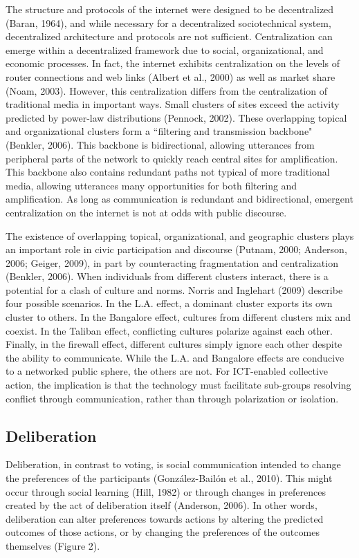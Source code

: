The structure and protocols of the internet were designed to be decentralized (Baran, 1964), and while necessary for a decentralized sociotechnical system, decentralized architecture and protocols are not sufficient. Centralization can emerge within a decentralized framework due to social, organizational, and economic processes. In fact, the internet exhibits centralization on the levels of router connections and web links (Albert et al., 2000) as well as market share (Noam, 2003). However, this centralization differs from the centralization of traditional media in important ways. Small clusters of sites exceed the activity predicted by power-law distributions (Pennock, 2002). These overlapping topical and organizational clusters form a “filtering and transmission backbone" (Benkler, 2006). This backbone is bidirectional, allowing utterances from peripheral parts of the network to quickly reach central sites for amplification. This backbone also contains redundant paths not typical of more traditional media, allowing utterances many opportunities for both filtering and amplification. As long as communication is redundant and bidirectional, emergent centralization on the internet is not at odds with public discourse.

The existence of overlapping topical, organizational, and geographic clusters plays an important role in civic participation and discourse (Putnam, 2000; Anderson, 2006; Geiger, 2009), in part by counteracting fragmentation and centralization (Benkler, 2006). When individuals from different clusters interact, there is a potential for a clash of culture and norms. Norris and Inglehart (2009) describe four possible scenarios. In the L.A. effect, a dominant cluster exports its own cluster to others. In the Bangalore effect, cultures from different clusters mix and coexist. In the Taliban effect, conflicting cultures polarize against each other. Finally, in the firewall effect, different cultures simply ignore each other despite the ability to communicate. While the L.A. and Bangalore effects are conducive to a networked public sphere, the others are not. For ICT-enabled collective action, the implication is that the technology must facilitate sub-groups resolving conflict through communication, rather than through polarization or isolation.

\subsection{Deliberation}
Deliberation, in contrast to voting, is social communication intended to change the preferences of the participants (Gonz\'alez-Bail\'on et al., 2010). This might occur through social learning (Hill, 1982) or through changes in preferences created by the act of deliberation itself (Anderson, 2006). In other words, deliberation can alter preferences towards actions by altering the predicted outcomes of those actions, or by changing the preferences of the outcomes themselves (Figure 2).

